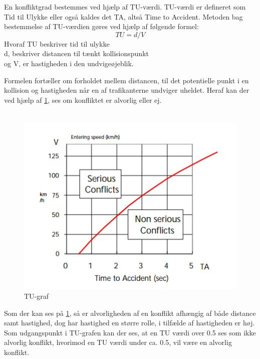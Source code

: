  En konfliktgrad bestemmes ved hjælp af TU-værdi. TU-værdi er defineret som Tid til Ulykke eller også kaldes det TA, altså Time to Accident. Metoden bag bestemmelse af TU-værdien gøres ved hjælp af følgende formel:
 \begin{equation}
  TU=d/V
\end{equation}
Hvoraf TU beskriver tid til ulykke \\ d, beskriver distancen til tænkt kollisionspunkt \\ og V, er hastigheden i den undvigeøjeblik.

Formelen fortæller om forholdet mellem distancen, til det potentielle punkt i en kollision og hastigheden når en af trafikanterne undviger uheldet. Heraf kan der ved hjælp af \cref{fig:tugraff}, ses om konfliktet er alvorlig eller ej.
~\\\\

\begin{figure}[htbp]
  \label{fig:tugraff}
  \centering
  \begin{adjustbox}{max width=\textwidth}
    \includegraphics{billederogfigur/tugraf.png} %
 \end{adjustbox}
  \caption{TU-graf}
\end{figure}

Som der kan ses på \cref{fig:tugraff}, så er alvorligheden af en konflikt afhængig af både distance samt hastighed, dog har hastighed en større rolle, i tilfælde af hastigheden er høj.
Som udgangspunkt i TU-grafen kan der ses, at en TU værdi over 0.5 ses som ikke alvorlig konflikt, hvorimod en TU værdi under ca. 0.5, vil være en alvorlig konflikt.




